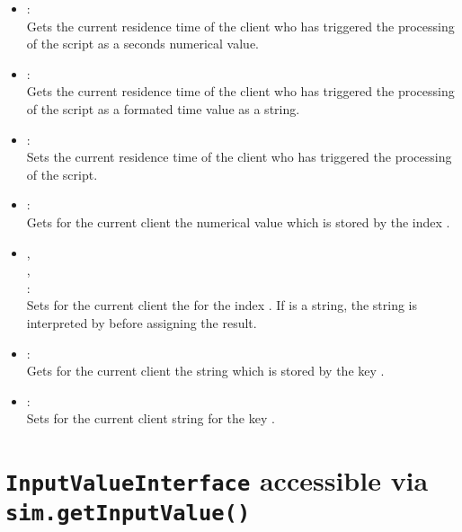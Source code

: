 \begin{itemize}
\item
{}:\\
Gets the current residence time of the client who has triggered the processing of the script as a seconds numerical value.

\item
{}:\\
Gets the current residence time of the client who has triggered the processing of the script as a formated time value as a string.

\item
{}:\\
Sets the current residence time of the client who has triggered the processing of the script.
  
\item
{}:\\
Gets for the current client the numerical value which is stored by the index .
  
\item
{},\\
,\\
:\\
Sets for the current client the  for the index .
If  is a string, the string is interpreted by
 before assigning the result.
  
\item
{}:\\
Gets for the current client the string which is stored by the key .
  
\item
{}:\\
Sets for the current client string  for the key .
	
\end{itemize}



\chapter{\texttt{InputValueInterface} accessible via \texttt{sim.getInputValue()}}

